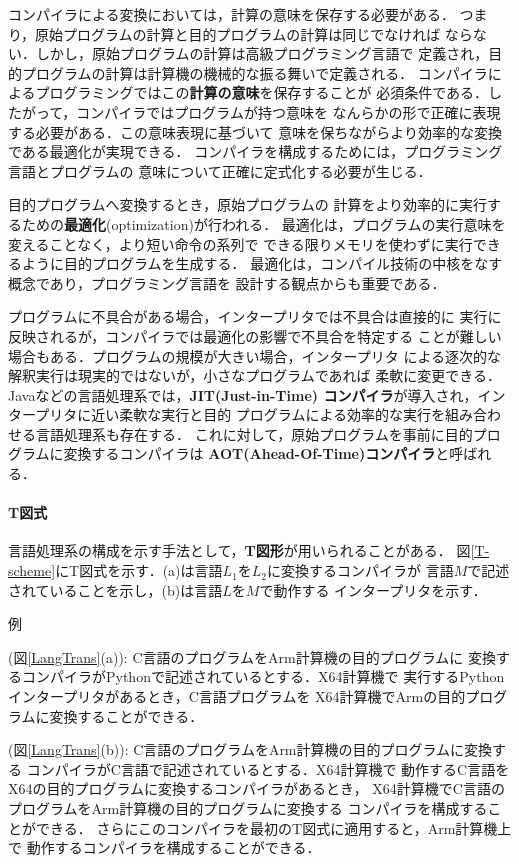 \documentclass[a4j,dvipdfmx]{jbook}
\begin{document}
コンパイラによる変換においては，計算の意味を保存する必要がある．
つまり，原始プログラムの計算と目的プログラムの計算は同じでなければ
ならない．しかし，原始プログラムの計算は高級プログラミング言語で
定義され，目的プログラムの計算は計算機の機械的な振る舞いで定義される．
コンパイラによるプログラミングではこの{\bf 計算の意味}を保存することが
必須条件である．したがって，コンパイラではプログラムが持つ意味を
なんらかの形で正確に表現する必要がある．この意味表現に基づいて
意味を保ちながらより効率的な変換である最適化が実現できる．
コンパイラを構成するためには，プログラミング言語とプログラムの
意味について正確に定式化する必要が生じる．

目的プログラムへ変換するとき，原始プログラムの
計算をより効率的に実行するための{\bf 最適化}(optimization)が行われる．
最適化は，プログラムの実行意味を変えることなく，より短い命令の系列で
できる限りメモリを使わずに実行できるように目的プログラムを生成する．
最適化は，コンパイル技術の中核をなす概念であり，プログラミング言語を
設計する観点からも重要である．

プログラムに不具合がある場合，インタープリタでは不具合は直接的に
実行に反映されるが，コンパイラでは最適化の影響で不具合を特定する
ことが難しい場合もある．プログラムの規模が大きい場合，インタープリタ
による逐次的な解釈実行は現実的ではないが，小さなプログラムであれば
柔軟に変更できる．Javaなどの言語処理系では，{\bf JIT(Just-in-Time)
コンパイラ}が導入され，インタープリタに近い柔軟な実行と目的
プログラムによる効率的な実行を組み合わせる言語処理系も存在する．
これに対して，原始プログラムを事前に目的プログラムに変換するコンパイラは
{\bf AOT(Ahead-Of-Time)コンパイラ}と呼ばれる．

\paragraph*{T図式}

言語処理系の構成を示す手法として，{\bf T図形}が用いられることがある．
図\ref{T-scheme}にT図式を示す．(a)は言語$L_1$を$L_2$に変換するコンパイラが
言語$M$で記述されていることを示し，(b)は言語$L$を$M$で動作する
インタープリタを示す．

\begin{list}{例}{}
  \item (図\ref{LangTrans}(a)):
        C言語のプログラムをArm計算機の目的プログラムに
        変換するコンパイラがPythonで記述されているとする．X64計算機で
        実行するPythonインタープリタがあるとき，C言語プログラムを
        X64計算機でArmの目的プログラムに変換することができる．
  \item (図\ref{LangTrans}(b)):
        C言語のプログラムをArm計算機の目的プログラムに変換する
        コンパイラがC言語で記述されているとする．X64計算機で
        動作するC言語をX64の目的プログラムに変換するコンパイラがあるとき，
        X64計算機でC言語のプログラムをArm計算機の目的プログラムに変換する
        コンパイラを構成することができる．
        さらにこのコンパイラを最初のT図式に適用すると，Arm計算機上で
        動作するコンパイラを構成することができる．
\end{list}
\end{document}
